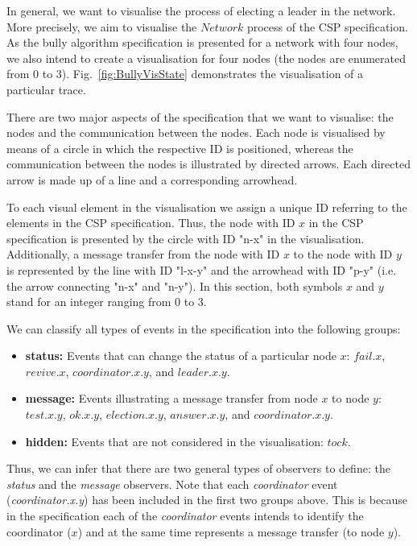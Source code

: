 In general, we want to visualise the process of electing a leader in the network.
More precisely, we aim to visualise the $Network$ process of the CSP specification.
As the bully algorithm specification is presented for a network with four nodes, we also intend to create a visualisation for four nodes (the nodes are enumerated from 0 to 3). 
Fig.~\ref{fig:BullyVisState} demonstrates the visualisation of a particular trace.

There are two major aspects of the specification that we want to visualise: the nodes and the communication between the nodes.
Each node is visualised by means of a circle in which the respective ID is positioned, whereas the communication between the nodes is illustrated by directed arrows.
Each directed arrow is made up of a line and a corresponding arrowhead.

To each visual element in the visualisation we assign a unique ID referring to the elements in the CSP specification.
Thus, the node with ID $x$ in the CSP specification is presented by the circle with ID "n-x" in the visualisation.
Additionally, a message transfer from the node with ID $x$ to the node with ID $y$ is represented by the line with ID "l-x-y" and the arrowhead with ID "p-y" (i.e. the arrow connecting "n-x" and "n-y").
In this section, both symbols $x$ and $y$ stand for an integer ranging from 0 to 3.

We can classify all types of events in the specification into the following groups:
\begin{itemize}
\item \textbf{status:} Events that can change the status of a particular node $x$: $fail.x$, $revive.x$, $coordinator.x.y$, and $leader.x.y$.
\item \textbf{message:} Events illustrating a message transfer from node $x$ to node $y$: $test.x.y$, $ok.x.y$, $election.x.y$, $answer.x.y$, and $coordinator.x.y$.
\item \textbf{hidden:} Events that are not considered in the visualisation: $tock$.
\end{itemize}
Thus, we can infer that there are two general types of observers to define: the \textit{status} and the \textit{message} observers.
Note that each \textit{coordinator} event (\textit{coordinator.x.y}) has been included in the first two groups above. 
This is because in the specification each of the \textit{coordinator} events intends to identify the coordinator ($x$) and at the same time represents a message transfer (to node $y$).

